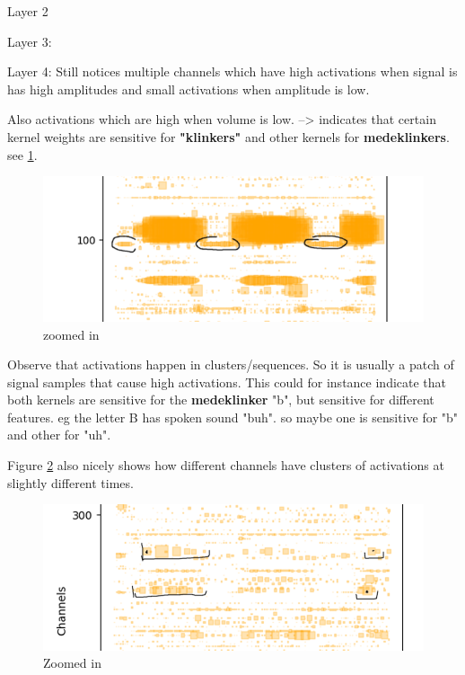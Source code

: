 \begin{appendices}
	Layer 2
	
	Layer 3:
	
	Layer 4:
	Still notices multiple channels which have high activations when signal is has high amplitudes and small activations when amplitude is low. 
	
	Also activations which are high when volume is low. --> indicates that certain kernel weights are sensitive for \textbf{"klinkers"} and other kernels for \textbf{medeklinkers}. see \ref{fig:screenshot008}.
	
	\begin{figure}[h]
		\centering
		\includegraphics[width=0.7\linewidth]{screenshot008}
		\caption{zoomed in}
		\label{fig:screenshot008}
	\end{figure}
	
	
	Observe that activations happen in clusters/sequences. So it is usually a patch of signal samples that cause high activations. This could for instance indicate that both kernels are sensitive for the \textbf{medeklinker} "b", but sensitive for different features. eg the letter B has spoken sound "buh". so maybe one is sensitive for "b" and other for "uh".
	
	Figure \ref{fig:layer4 zoomed in} also nicely shows how different channels have clusters of activations at slightly different times. 
	
	\begin{figure}[h]
		\centering
		\includegraphics[width=0.7\linewidth]{screenshot010}
		\caption{Zoomed in}
		\label{fig:layer4 zoomed in}
	\end{figure}
	
\end{appendices}